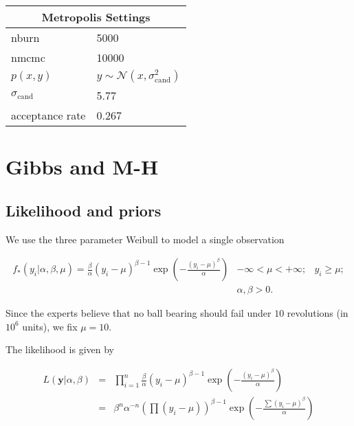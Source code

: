 \documentclass[12pt]{article}
\newcommand{\m}[1]{\mathbf{\bm{#1}}}
\begin{document}
\begin{center}
\begin{tabular}{ll}
\multicolumn{2}{c}{Metropolis Settings} \\ \hline \smallskip
nburn            & 5000 \\ \smallskip
nmcmc            & 10000 \\ \smallskip
$p(x, y)$ & $y\sim\mathcal{N}(x, \sigma_\mathrm{cand}^2)$ \\ \smallskip
$\sigma_{\mathrm{cand}} $ & 5.77 \\ \smallskip
acceptance rate  & 0.267 \\
\end{tabular}
\end{center}

\newpage

\section{Gibbs and M-H}

\subsection{Likelihood and priors}

\noindent We use the three parameter Weibull to model a single observation

\begin{eqnarray*}
f_*(y_i|\alpha, \beta, \mu) = \frac{\beta}{\alpha}(y_i-\mu)^{\beta-1}\exp\left(-\frac{(y_i-\mu)^\beta}{\alpha}\right) & -\infty < \mu < +\infty; & y_i \geq \mu; \\
& \alpha, \beta > 0.
\end{eqnarray*}

\noindent Since the experts believe that no ball bearing should fail under $10$ revolutions (in $10^6$ units), we fix $\mu=10$. %
\bigskip

\noindent The likelihood is given by

\begin{eqnarray*}
L(\m{y}|\alpha, \beta) &=& \prod_{i=1}^n\frac{\beta}{\alpha}(y_i-\mu)^{\beta-1}\exp\left(-\frac{(y_i-\mu)^\beta}{\alpha}\right)  \\
 &=& \beta^n\alpha^{-n}\left(\prod (y_i-\mu)\right)^{\beta-1}\exp\left(-\frac{\sum (y_i-\mu)^\beta}{\alpha}\right)
\end{eqnarray*}
\end{document}
